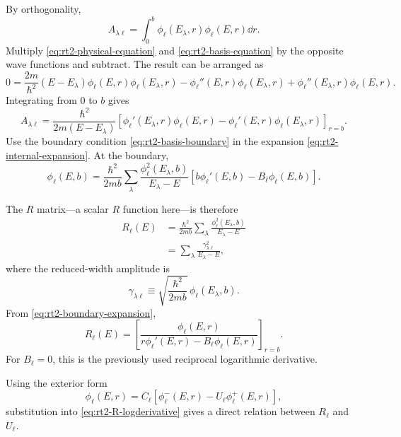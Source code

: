 By orthogonality,
\begin{equation*}
  A_{\lambda\ell}
  =\int_0^b\phi_\ell(E_\lambda,r)\phi_\ell(E,r)\dd r.
  \tag{24}
\end{equation*}
Multiply \eqref{eq:rt2-physical-equation} and \eqref{eq:rt2-basis-equation} by the opposite wave functions and subtract.  The result can be arranged as
\begin{equation*}
  0=\frac{2m}{\hbar^2}(E-E_\lambda)
  \phi_\ell(E,r)\phi_\ell(E_\lambda,r)
  -\phi_\ell''(E,r)\phi_\ell(E_\lambda,r)
  +\phi_\ell''(E_\lambda,r)\phi_\ell(E,r).
  \tag{25}
\end{equation*}
Integrating from $0$ to $b$ gives
\begin{equation*}
  A_{\lambda\ell}
  =\frac{\hbar^2}{2m(E-E_\lambda)}
  \left[
  \phi_\ell'(E_\lambda,r)\phi_\ell(E,r)
  -\phi_\ell'(E,r)\phi_\ell(E_\lambda,r)
  \right]_{r=b}.
  \tag{26}
\end{equation*}
Use the boundary condition \eqref{eq:rt2-basis-boundary} in the expansion \eqref{eq:rt2-internal-expansion}.  At the boundary,
\begin{equation*}
  \phi_\ell(E,b)
  =\frac{\hbar^2}{2mb}
  \sum_\lambda
  \frac{\phi_\ell^2(E_\lambda,b)}{E_\lambda-E}
  \left[b\phi_\ell'(E,b)-B_\ell\phi_\ell(E,b)\right].
  \tag{27}\label{eq:rt2-boundary-expansion}
\end{equation*}

The $R$ matrix---a scalar $R$ function here---is therefore
\begin{align*}
  R_\ell(E)
  &=\frac{\hbar^2}{2mb}
  \sum_\lambda
  \frac{\phi_\ell^2(E_\lambda,b)}{E_\lambda-E}
  \tag{28a}\\
  &=\sum_\lambda\frac{\gamma_{\lambda\ell}^2}{E_\lambda-E},
  \tag{28b}
\end{align*}
where the reduced-width amplitude is
\begin{equation*}
  \gamma_{\lambda\ell}
  \equiv\sqrt{\frac{\hbar^2}{2mb}}\,\phi_\ell(E_\lambda,b).
  \tag{29}
\end{equation*}
From \eqref{eq:rt2-boundary-expansion},
\begin{equation*}
  R_\ell(E)
  =\left[
  \frac{\phi_\ell(E,r)}
  {r\phi_\ell'(E,r)-B_\ell\phi_\ell(E,r)}
  \right]_{r=b}.
  \tag{30}\label{eq:rt2-R-logderivative}
\end{equation*}
For $B_\ell=0$, this is the previously used reciprocal logarithmic derivative.

Using the exterior form
\[
  \phi_\ell(E,r)=C_\ell\left[\phi_\ell^-(E,r)-U_\ell\phi_\ell^+(E,r)\right],
\]
substitution into \eqref{eq:rt2-R-logderivative} gives a direct relation between $R_\ell$ and $U_\ell$.

